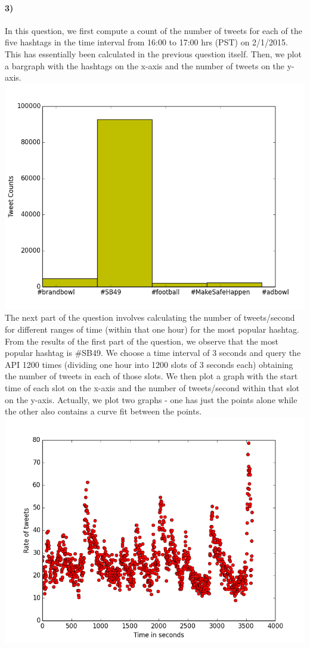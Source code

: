 \documentclass{article}
\begin{document}
\paragraph{3)}
In this question, we first compute a count of the number of tweets for each of the five hashtags in the time interval
from 16:00 to 17:00 hrs (PST) on 2/1/2015. This has essentially been calculated
in the previous question itself. Then, we plot a bargraph with the hashtags on the x-axis 
and the number of tweets on the y-axis. \\
\includegraphics[scale=0.6]{Q3a_plot} 
The next part of the question involves calculating the number of tweets/second for different ranges of time (within that one hour)
for the most popular hashtag. From the results of the first part of the question, we observe that the most popular hashtag
is \#SB49. We choose a time interval of 3 seconds and query the API 1200 times (dividing one hour
into 1200 slots of 3 seconds each) obtaining the number of tweets in each of those slots. 
We then plot a graph with the start time of each slot on the x-axis and the number of tweets/second within that slot
on the y-axis. Actually, we plot two graphs - one has just the points alone while the other also contains a curve fit
between the points.
\includegraphics[scale=0.6]{Q3b_plot2} 
\end{document}
